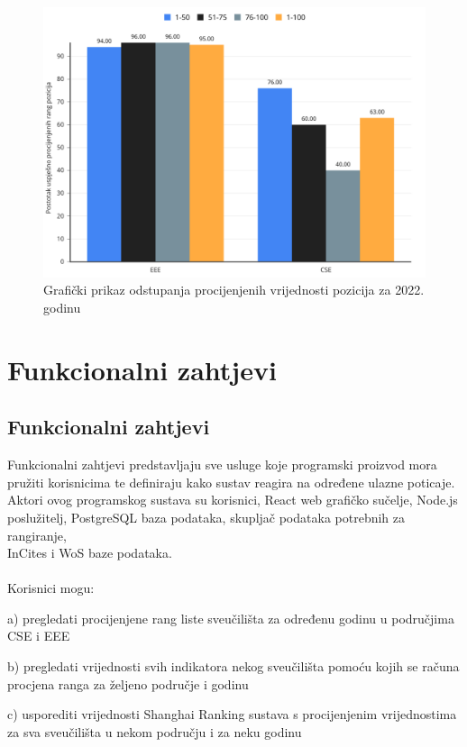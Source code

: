 \documentclass[times, utf8, zavrsni]{fer}
\begin{document}
    \begin{figure}[htb]
        \centering
        \includegraphics[scale=0.25]{pozicije2022.png}
        \caption{Grafički prikaz odstupanja procijenjenih vrijednosti pozicija za 2022. godinu}
        \label{fig:pozicije2022}
        \end{figure}   


\chapter{Funkcionalni zahtjevi}
\section{Funkcionalni zahtjevi}
Funkcionalni zahtjevi predstavljaju sve usluge koje programski proizvod mora pružiti korisnicima te definiraju kako sustav reagira na određene ulazne poticaje.
\\ Aktori ovog programskog sustava su korisnici, React web grafičko sučelje, Node.js poslužitelj, PostgreSQL baza podataka, skupljač podataka potrebnih za rangiranje, 
\\InCites i WoS baze podataka.
\\
\\Korisnici mogu:

a) pregledati procijenjene rang liste sveučilišta za određenu godinu u područjima CSE i EEE

b) pregledati vrijednosti svih indikatora nekog sveučilišta pomoću kojih se računa procjena ranga za željeno područje i godinu

c) usporediti vrijednosti Shanghai Ranking sustava s procijenjenim vrijednostima za sva sveučilišta u nekom području i za neku godinu
\end{document}
